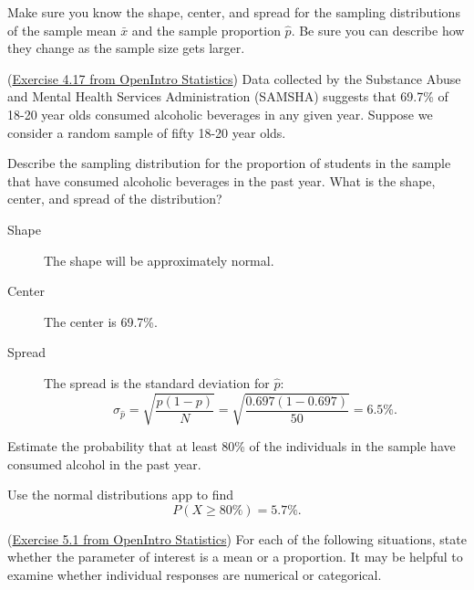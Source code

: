 \documentclass[12pt]{exam}
\newcounter{countA}
\begin{document}
Make sure you know the shape, center, and spread for the sampling
distributions of the sample mean \(\bar{x}\) and the sample proportion
\(\hat{p}\). Be sure you can describe how they change as the sample size
gets larger.

\begin{questions}
\setcounter{question}{\value{countA}}

\item (\href{http://people.hsc.edu/faculty-staff/blins/books/OpenIntroStats4e.pdf\#eoce.4.17}{Exercise 4.17 from OpenIntro Statistics}) 
  Data collected by the Substance Abuse and Mental Health Services
  Administration (SAMSHA) suggests that 69.7\% of 18-20 year olds
  consumed alcoholic beverages in any given year. Suppose we consider a
  random sample of fifty 18-20 year olds.

  \begin{parts}
  \item
    Describe the sampling distribution for the proportion of students in the sample that have
    consumed alcoholic beverages in the past year. What is the shape,
    center, and spread of the distribution?
\begin{solution}
\begin{description}
\item[Shape] The shape will be approximately normal.
\item[Center] The center is 69.7\%.
\item[Spread] The spread is the standard deviation for $\hat{p}$:
$$\sigma_{\hat{p}} = \sqrt{\frac{p(1-p)}{N}} = \sqrt{\frac{0.697(1 - 0.697)}{50}} = 6.5\%.$$
\end{description}
\end{solution}
\vfill
  \item
    Estimate the probability that at least 80\% of the individuals in
    the sample have consumed alcohol in the past year.
\begin{solution}
Use the normal distributions app to find
$$P(X \ge 80\%) = 5.7\%.$$
\end{solution}
\vfill
  \end{parts}
\item
  (\href{http://people.hsc.edu/faculty-staff/blins/books/OpenIntroStats4e.pdf\#eoce.5.1}{Exercise 5.1 from OpenIntro Statistics}) For each of the following situations, state whether the
  parameter of interest is a mean or a proportion. It may be helpful to
  examine whether individual responses are numerical or categorical.


\end{questions}
\end{document}
